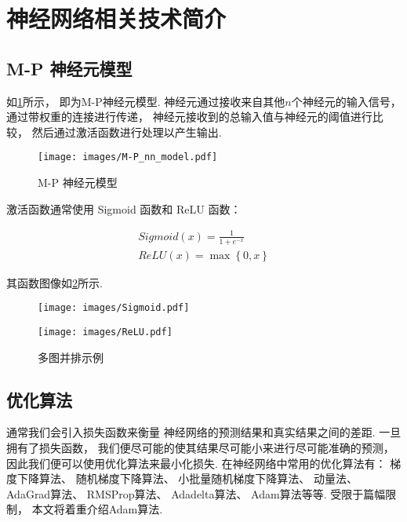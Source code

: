 \section{神经网络相关技术简介}

\subsection{M-P 神经元模型}

如\cref{fig:M-P}所示，
即为M-P神经元模型.
神经元通过接收来自其他$n$个神经元的输入信号，
通过带权重的连接进行传递，
神经元接收到的总输入值与神经元的阈值进行比较，
然后通过激活函数进行处理以产生输出\cite{zhouzhihuaJiQiXueXi}.

\begin{figure}[!htbp]
    \centering
    \texttt{[image: images/M-P\_nn\_model.pdf]}
    \caption{M-P 神经元模型}\label{fig:M-P}
\end{figure}

激活函数通常使用 Sigmoid 函数和 ReLU 函数：

\begin{equation}
    \label{eq:sigmoid}
    \begin{aligned}
        Sigmoid\left(x\right) = \frac{1}{1+e^{-x}} \\
        ReLU\left(x\right) = \max\left\{0, x\right\}
    \end{aligned}
\end{equation}

其函数图像如\cref{fig:active-func}所示.

\begin{figure}
    \centering
    \begin{minipage}[b]{0.45\textwidth}
        \centering
        \texttt{[image: images/Sigmoid.pdf]}
        \label{fig:sigmoid}
    \end{minipage}
    \begin{minipage}[b]{0.45\textwidth}
        \centering
        \texttt{[image: images/ReLU.pdf]}
        \label{fig:ReLu}
    \end{minipage}
    \caption{多图并排示例}\label{fig:active-func}
\end{figure}

\subsection{优化算法}

通常我们会引入损失函数来衡量
神经网络的预测结果和真实结果之间的差距.
一旦拥有了损失函数，
我们便尽可能的使其结果尽可能小来进行尽可能准确的预测，
因此我们便可以使用优化算法来最小化损失.
在神经网络中常用的优化算法有：
梯度下降算法、
随机梯度下降算法、
小批量随机梯度下降算法、
动量法、
AdaGrad算法、
RMSProp算法、
Adadelta算法、
Adam算法等等.
受限于篇幅限制，
本文将着重介绍Adam算法.

